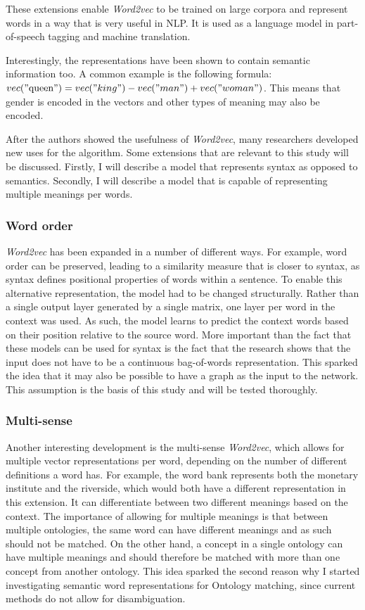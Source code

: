 \documentclass{article}
\begin{document}
 These extensions enable \emph{Word2vec} to be trained on large corpora and represent words in a way that is very useful in NLP. It is used as a language model in part-of-speech tagging and machine translation.
 
 Interestingly, the representations have been shown to contain semantic information too. A common example is the following formula: $vec("\text{queen}") = vec("king") - vec("man") + vec("woman")$. This means that gender is encoded in the vectors and other types of meaning may also be encoded.
 
 After the authors showed the usefulness of \emph{Word2vec}, many researchers developed new uses for the algorithm. Some extensions that are relevant to this study will be discussed. Firstly, I will describe a model that represents syntax as opposed to semantics. Secondly, I will describe a model that is capable of representing multiple meanings per words.
 
 \subsubsection{Word order} \label{wordorder}
 \emph{Word2vec} has been expanded in a number of different ways. For example, word order can be preserved, leading to a similarity measure that is closer to syntax, as syntax defines positional properties of words within a sentence\cite{ling2015}. To enable this alternative representation, the model had to be changed structurally. Rather than a single output layer generated by a single matrix, one layer per word in the context was used. As such, the model learns to predict the context words based on their position relative to the source word. More important than the fact that these models can be used for syntax is the fact that the research shows that the input does not have to be a continuous bag-of-words representation. This sparked the idea that it may also be possible to have a graph as the input to the network. This assumption is the basis of this study and will be tested thoroughly.
 
 \subsubsection{Multi-sense} \label{multisense}
 Another interesting development is the multi-sense \emph{Word2vec}, which allows for multiple vector representations per word, depending on the number of different definitions a word has. For example, the word bank represents both the monetary institute and the riverside, which would both have a different representation in this extension. It can differentiate between two different meanings based on the context. The importance of allowing for multiple meanings is that between multiple ontologies, the same word can have different meanings and as such should not be matched. On the other hand, a concept in a single ontology can have multiple meanings and should therefore be matched with more than one concept from another ontology\cite{multisense}. This idea sparked the second reason why I started investigating semantic word representations for Ontology matching, since current methods do not allow for disambiguation.
 
\end{document}
